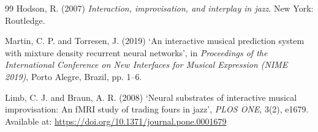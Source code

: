 \documentclass[11pt,a4paper]{article}
\begin{document}
\begin{thebibliography}{99}
Hodson, R. (2007) 
\textit{Interaction, improvisation, and interplay in jazz}. 
New York: Routledge.

Martin, C. P. and Torresen, J. (2019) 
`An interactive musical prediction system with mixture density recurrent neural networks', 
in \textit{Proceedings of the International Conference on New Interfaces for Musical Expression (NIME 2019)}, 
Porto Alegre, Brazil, pp. 1--6.

Limb, C. J. and Braun, A. R. (2008) 
`Neural substrates of interactive musical improvisation: An fMRI study of trading fours in jazz', 
\textit{PLOS ONE}, 3(2), e1679. 
Available at: \url{https://doi.org/10.1371/journal.pone.0001679}
\end{thebibliography}
\end{document}
